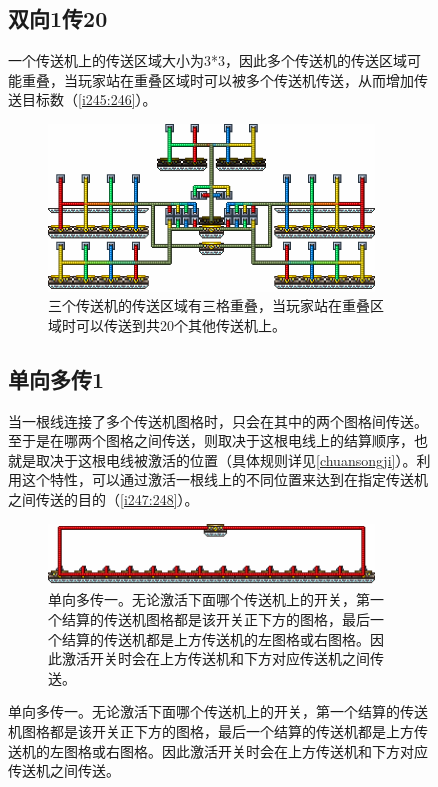 \begin{figure}[!ht]
\subsection{双向1传20}\label{sec12}
一个传送机上的传送区域大小为3*3，因此多个传送机的传送区域可能重叠，当玩家站在重叠区域时可以被多个传送机传送，从而增加传送目标数（\autoref{i245:246}）。

\begin{figure}[!ht]
\centering
\includegraphics[width=0.95\textwidth]{images/246.png}
\caption{三个传送机的传送区域有三格重叠，当玩家站在重叠区域时可以传送到共20个其他传送机上。}
\label{i245:246}
\end{figure}

\subsection{单向多传1}\label{sec13}
当一根线连接了多个传送机图格时，只会在其中的两个图格间传送。至于是在哪两个图格之间传送，则取决于这根电线上的结算顺序，也就是取决于这根电线被激活的位置（具体规则详见\autoref{chuansongji}）。利用这个特性，可以通过激活一根线上的不同位置来达到在指定传送机之间传送的目的（\autoref{i247:248}）。

\begin{figure}[!ht]
\centering
\includegraphics[width=0.95\textwidth]{images/248.png}
\caption{单向多传一。无论激活下面哪个传送机上的开关，第一个结算的传送机图格都是该开关正下方的图格，最后一个结算的传送机都是上方传送机的左图格或右图格。因此激活开关时会在上方传送机和下方对应传送机之间传送。}
\label{i247:248}
\end{figure}


\end{figure}
